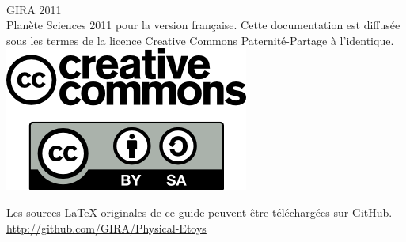 \documentclass[a4paper,12pt]{article}
\begin{document}
\clearpage
\thispagestyle{empty}
~
\vfill
\begin{center}
        GIRA 2011\\
        Planète Sciences 2011 pour la version française.
        Cette documentation est diffusée sous les termes de la licence Creative Commons Paternité-Partage à l'identique.\\
        \vspace{2cm}
        \includegraphics[scale=0.5]{../shared/images/logo_cc.png}
\end{center}

\vfill

\begin{center}
        Les sources LaTeX originales de ce guide peuvent être téléchargées sur GitHub.
        \url{http://github.com/GIRA/Physical-Etoys}
\end{center}

\vfill
\end{document}
